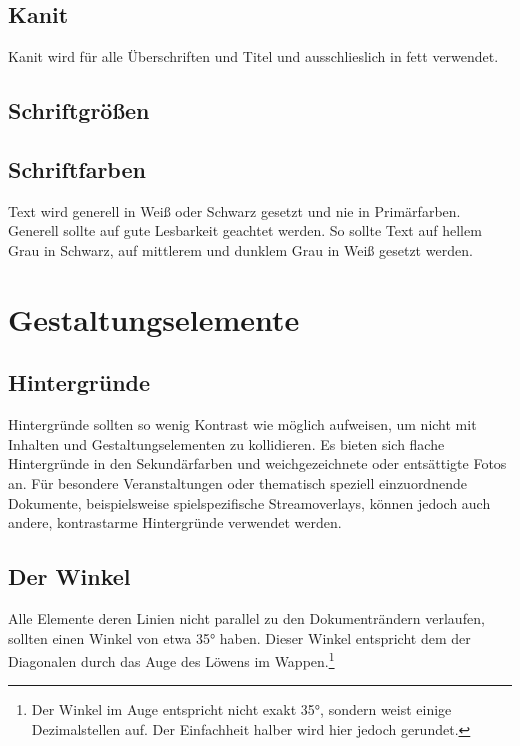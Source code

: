 \documentclass{article}
\begin{document}
\subsection{Kanit}
\begin{samepage}
Kanit wird für alle Überschriften und Titel und ausschlieslich in fett verwendet.

\end{samepage}

\subsection{Schriftgrößen}

\subsection{Schriftfarben}
Text wird generell in Weiß oder Schwarz gesetzt und nie in Primärfarben. Generell sollte auf gute Lesbarkeit geachtet werden. So sollte Text auf hellem Grau in Schwarz, auf mittlerem und dunklem Grau in Weiß gesetzt werden.

\cleardoublepage
\section{Gestaltungselemente}

\subsection{Hintergründe}
Hintergründe sollten so wenig Kontrast wie möglich aufweisen, um nicht mit Inhalten und Gestaltungselementen zu kollidieren.
Es bieten sich flache Hintergründe in den Sekundärfarben und weichgezeichnete oder entsättigte Fotos an.
Für besondere Veranstaltungen oder thematisch speziell einzuordnende Dokumente, beispielsweise spielspezifische Streamoverlays, können jedoch auch andere, kontrastarme Hintergründe verwendet werden.


\subsection{Der Winkel}
Alle Elemente deren Linien nicht parallel zu den Dokumenträndern verlaufen, sollten einen Winkel von etwa 35° haben.
Dieser Winkel entspricht dem der Diagonalen durch das Auge des Löwens im Wappen.\footnote{Der Winkel im Auge entspricht nicht exakt 35°, sondern weist einige Dezimalstellen auf. Der Einfachheit halber wird hier jedoch gerundet.}
\end{document}
